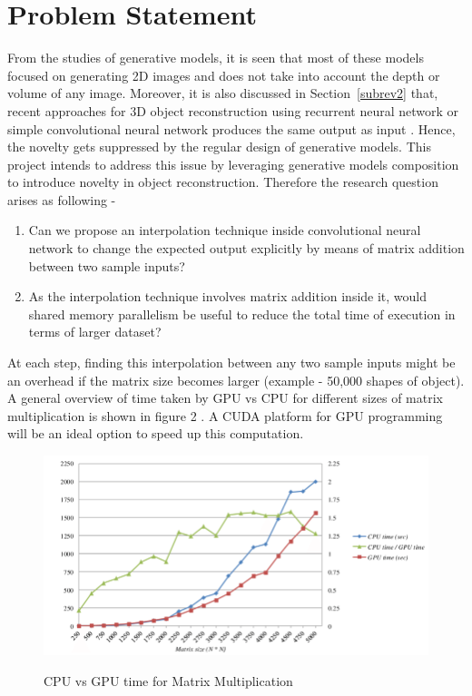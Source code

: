\documentclass[11pt]{article}       %
\begin{document}
\section{Problem Statement} \label{problemStatement}
From the studies of generative models, it is seen that most of these models focused on generating 2D images and does not take into account the depth or volume of any image. Moreover, it is also discussed in Section~\ref{subrev2} that, recent approaches for 3D object reconstruction using recurrent neural network \cite{dr7} or simple convolutional neural network \cite{dr2} produces the same output as input . Hence, the novelty gets suppressed by the regular design of generative models. This project intends to address this issue by leveraging generative models composition to introduce novelty in object reconstruction. Therefore the research question arises as following -     
\begin{enumerate}
\item Can we propose an interpolation technique inside convolutional neural network to change the expected output explicitly by means of matrix addition between two sample inputs?
\item As the interpolation technique involves matrix addition inside it, would shared memory parallelism be useful to reduce the total time of execution in terms of larger dataset?
\end{enumerate}
At each step, finding this interpolation between any two sample inputs might be an overhead if the matrix size becomes larger (example - 50,000 shapes of object). A general overview of time taken by GPU vs CPU for different sizes of matrix multiplication is shown in figure 2 \cite{latcharote2013high}. A CUDA platform for GPU programming will be an ideal option to speed up this computation.  
\begin{figure}[h]
\begin{center}
\includegraphics[scale=0.5]{time.png}
\caption{CPU vs GPU time for Matrix Multiplication}\cite{latcharote2013high}
\end{center}
\end{figure}
\end{document}
